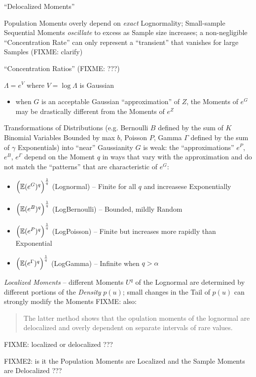 ``Delocalized Moments''

Population Moments overly depend on \emph{exact} Lognormality; Small-sample
Sequential Moments \emph{oscillate} to excess as Sample size increases; a
non-negligible ``Concentration Rate'' can only represent a ``transient'' that
vanishes for large Samples (FIXME: clarify)

``Concentration Ratios'' (FIXME: ???)

$\Lambda = e^V$ where $V = \log \Lambda$ is Gaussian

\begin{itemize}
  \item when $G$ is an acceptable Gaussian ``approximation'' of $Z$, the Moments
    of $e^G$ may be drastically different from the Moments of $e^Z$
\end{itemize}

Transformations of Distributions (e.g. Bernoulli $B$ defined by the sum of $K$
Binomial Variables Bounded by max $b$, Poisson $P$, Gamma $\Gamma$ defined by
the sum of $\gamma$ Exponentials) into ``near'' Gaussianity $G$ is weak: the
``approximations'' $e^P$, $e^B$, $e^\Gamma$ depend on the Moment $q$ in ways
that vary with the approximation and do not match the ``patterns'' that are
characteristic of $e^G$:
\begin{itemize}
  \item $\Big(\mathbb{E}(e^G)^q\Big)^\frac{1}{q}$ (Lognormal) -- Finite for all $q$
    and increasese Exponentially
  \item $\Big(\mathbb{E}(e^B)^q\Big)^\frac{1}{q}$ (LogBernoulli) -- Bounded, mildly
    Random
  \item $\Big(\mathbb{E}(e^P)^q\Big)^\frac{1}{q}$ (LogPoisson) -- Finite but
    increases more rapidly than Exponential
  \item $\Big(\mathbb{E}(e^\Gamma)^q\Big)^\frac{1}{q}$ (LogGamma) -- Infinite when
    $q > \alpha$
\end{itemize}

\emph{Localized Moments} -- different Moments $U^q$ of the Lognormal are
determined by different portions of the \emph{Density} $p(u)$; small changes in
the Tail of $p(u)$ can strongly modify the Moments
FIXME: also:
\begin{quote}
  The latter method shows that the opulation moments of the lognormal are
  delocalized and overly dependent on separate intervals of rare values.
\end{quote}
FIXME: localized or delocalized ???

FIXME2: is it the Population Moments are Localized and the Sample Moments are
Delocalized ???

